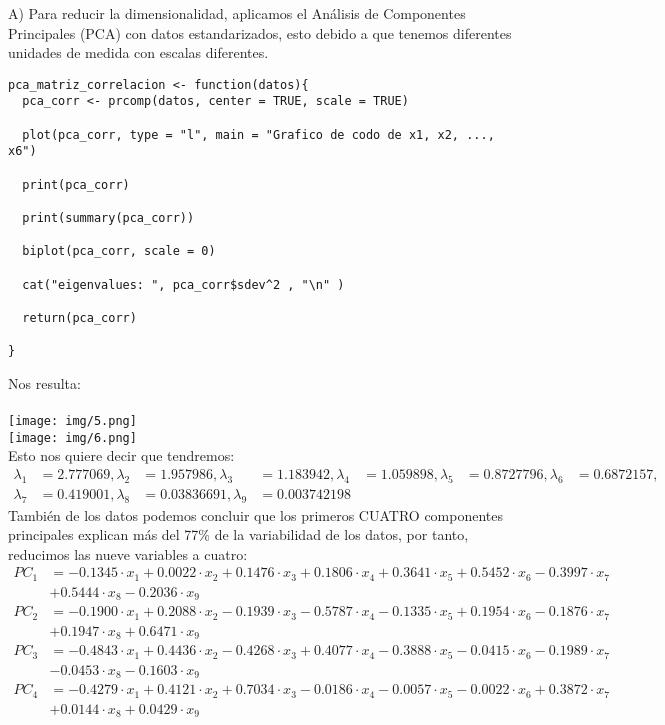 \begin{sol}A)
Para reducir la dimensionalidad, aplicamos el Análisis de Componentes Principales (PCA) con datos estandarizados, esto debido a que tenemos diferentes unidades de medida con escalas diferentes.
\begin{verbatim}
pca_matriz_correlacion <- function(datos){
  pca_corr <- prcomp(datos, center = TRUE, scale = TRUE)

  plot(pca_corr, type = "l", main = "Grafico de codo de x1, x2, ..., x6")

  print(pca_corr)

  print(summary(pca_corr))

  biplot(pca_corr, scale = 0)

  cat("eigenvalues: ", pca_corr$sdev^2 , "\n" )

  return(pca_corr)

}
\end{verbatim}
Nos resulta:\\\\
\texttt{[image: img/5.png]}\\
\texttt{[image: img/6.png]}\\
Esto nos quiere decir que tendremos:
\begin{align*}
\lambda_1 &= 2.777069, 
\lambda_2 &= 1.957986, 
\lambda_3 &= 1.183942, 
\lambda_4 &= 1.059898, 
\lambda_5 &= 0.8727796, 
\lambda_6 &= 0.6872157, \\
\lambda_7 &= 0.419001, 
\lambda_8 &= 0.03836691, 
\lambda_9 &= 0.003742198
\end{align*}
También de los datos podemos concluir que los primeros CUATRO componentes principales explican más del 77\% de la variabilidad de los datos, por tanto, reducimos las nueve variables a cuatro:
\begin{align*}
PC_1 &= -0.1345 \cdot x_1 + 0.0022 \cdot x_2 + 0.1476 \cdot x_3 + 0.1806 \cdot x_4 + 0.3641 \cdot x_5 + 0.5452 \cdot x_6 - 0.3997 \cdot x_7 \\ & + 0.5444 \cdot x_8 - 0.2036 \cdot x_9 \\
PC_2 &= -0.1900 \cdot x_1 + 0.2088 \cdot x_2 - 0.1939 \cdot x_3 - 0.5787 \cdot x_4 - 0.1335 \cdot x_5 + 0.1954 \cdot x_6 - 0.1876 \cdot x_7\\ & + 0.1947 \cdot x_8 + 0.6471 \cdot x_9 \\
PC_3 &= -0.4843 \cdot x_1 + 0.4436 \cdot x_2 - 0.4268 \cdot x_3 + 0.4077 \cdot x_4 - 0.3888 \cdot x_5 - 0.0415 \cdot x_6 - 0.1989 \cdot x_7 \\ &- 0.0453 \cdot x_8 - 0.1603 \cdot x_9 \\
PC_4 &= -0.4279 \cdot x_1 + 0.4121 \cdot x_2 + 0.7034 \cdot x_3 - 0.0186 \cdot x_4 - 0.0057 \cdot x_5 - 0.0022 \cdot x_6 + 0.3872 \cdot x_7 \\ &+ 0.0144 \cdot x_8 + 0.0429 \cdot x_9
\end{align*}


\end{sol}
